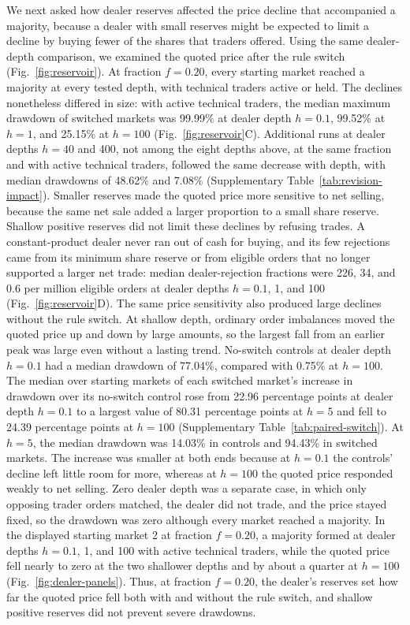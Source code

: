 We next asked how dealer reserves affected the price decline that
accompanied a majority, because a dealer with small reserves might be
expected to limit a decline by buying fewer of the shares that traders
offered. Using the same dealer-depth comparison, we examined the quoted
price after the rule switch (Fig.~\ref{fig:reservoir}). At fraction
$f=0.20$, every starting market reached a majority at every tested
depth, with technical traders active or held. The declines
nonetheless differed in size: with active technical traders, the median maximum drawdown of switched
markets was 99.99\% at dealer depth $h=0.1$, 99.52\% at $h=1$, and
25.15\% at $h=100$ (Fig.~\ref{fig:reservoir}C). Additional runs
at dealer depths $h=40$ and 400, not among the eight depths above, at the
same fraction and with active technical traders, followed the same
decrease with depth, with median drawdowns of 48.62\% and 7.08\%
(Supplementary Table~\ref{tab:revision-impact}). Smaller
reserves made the quoted price more sensitive to net selling, because
the same net sale added a larger proportion to a small share reserve.
Shallow positive reserves did not limit these declines by refusing
trades. A constant-product dealer never ran out of cash for buying, and
its few rejections came from its minimum share reserve or from eligible
orders that no longer supported a larger net trade: median dealer-rejection
fractions were 226, 34, and 0.6 per million eligible orders at dealer
depths $h=0.1$, 1, and 100 (Fig.~\ref{fig:reservoir}D).
The same price sensitivity also produced large declines without the
rule switch.
At shallow depth, ordinary order imbalances moved the quoted price up and
down by large amounts, so the largest fall from an earlier peak was large
even without a lasting trend.
No-switch controls at dealer depth $h=0.1$ had a median drawdown of
77.04\%, compared with 0.75\% at $h=100$. The median over starting markets of each switched market's increase in
drawdown over its no-switch control rose from 22.96 percentage points at
dealer depth $h=0.1$ to a largest value of 80.31 percentage points at
$h=5$ and fell to 24.39 percentage points at $h=100$ (Supplementary
Table~\ref{tab:paired-switch}). At $h=5$, the median drawdown was
14.03\% in controls and 94.43\% in switched markets.
The increase was smaller at both ends because at $h=0.1$ the controls'
decline left little room for more, whereas at $h=100$ the quoted price
responded weakly to net selling. Zero dealer depth was a separate case, in which only opposing trader orders
matched, the dealer did not trade, and the price stayed fixed, so the
drawdown was zero although every market reached a majority. In the
displayed starting market 2 at fraction $f=0.20$, a majority formed at
dealer depths $h=0.1$, 1, and 100 with active technical traders, while
the quoted price fell nearly to zero at the two shallower depths and by
about a quarter at $h=100$ (Fig.~\ref{fig:dealer-panels}). Thus, at
fraction $f=0.20$, the dealer's reserves set how far the quoted price
fell both with and without the rule switch, and shallow positive
reserves did not prevent severe drawdowns.

